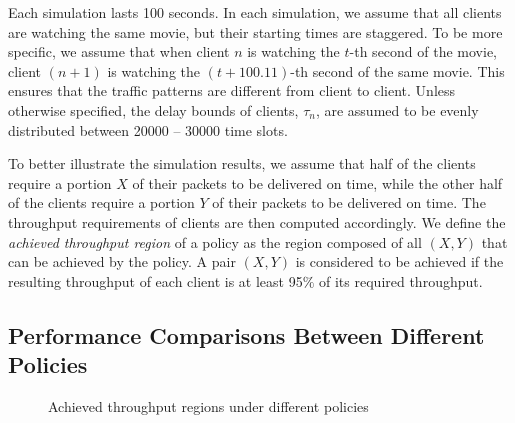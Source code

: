 \documentclass[10pt,nocopyrightspace]{sigplan-proc-varsize-1in}
\begin{document}
Each simulation lasts 100 seconds. In each simulation, we assume that all clients are watching the same movie, but their starting times are staggered. To be more specific, we assume that when client $n$ is watching the $t$-th second of the movie, client $(n+1)$ is watching the $(t+100.11)$-th second of the same movie. This ensures that the traffic patterns are different from client to client. Unless otherwise specified, the delay bounds of clients, $\tau_n$, are assumed to be evenly distributed between 20000 -- 30000 time slots. 

To better illustrate the simulation results, we assume that half of the clients require a portion $X$ of their packets to be delivered on time, while the other half of the clients require a portion $Y$ of their packets to be delivered on time. The throughput requirements of clients are then computed accordingly. We define the \emph{achieved throughput region} of a policy as the region composed of all $(X,Y)$ that can be achieved by the policy. A pair $(X,Y)$ is considered to be achieved if the resulting throughput of each client is at least 95$\%$ of its required throughput.


\subsection{Performance Comparisons Between Different Policies}	\label{section:simulation:policy}

\begin{figure*}
\hspace{0.01\linewidth} 
\hspace{0.01\linewidth} 
\caption{Achieved throughput regions under different policies}\label{fig:simulation:policy}
\end{figure*}
\end{document}
